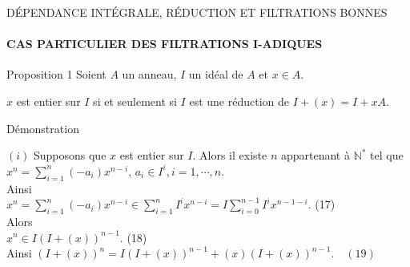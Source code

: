 \documentclass[11pt,a4paper]{beamer}
\begin{document}
		\begin{frame}{DÉPENDANCE INTÉGRALE, RÉDUCTION ET FILTRATIONS BONNES}
		\framesubtitle{CAS PARTICULIER DES FILTRATIONS I-ADIQUES}
		\begin{block}{Proposition 1}
				Soient $A$ un anneau, $I$ un idéal de $A$ et $x \in A$.
				\begin{center}
					$x$ est entier sur $I$ si et seulement si $I$ est une réduction de $I + (x) = I +xA $.
				\end{center}
		\end{block}
	\end{frame}
			\begin{frame}{Démonstration}
		\begin{block}{}
	$(i)$ Supposons que $x$ est entier sur $I$. Alors il existe $n $ appartenant à $ \mathbb{N^*}$ tel que \\ $x^n = \displaystyle \sum_{i=1}^{n}{(-a_i) x^{n-i}}$,  $a_i \in I^i, i=1, \cdots ,n$.\\ Ainsi \\ $x^n = \displaystyle \sum_{i=1}^{n}{(-a_i) x^{n-i}} \in \displaystyle \sum_{i=1}^{n}{I^i x^{n-i}} = I \displaystyle \sum_{i=0}^{n-1}{I^i x^{n-1-i}} $. (17)\\ Alors \\ $ x^n \in I(I+(x))^{n-1}.$ (18)\\
	Ainsi  $(I+(x))^n = I(I+(x))^{n-1} + (x)(I+(x))^{n-1}. \quad (19)$
		\end{block}
	\end{frame}
\end{document}
